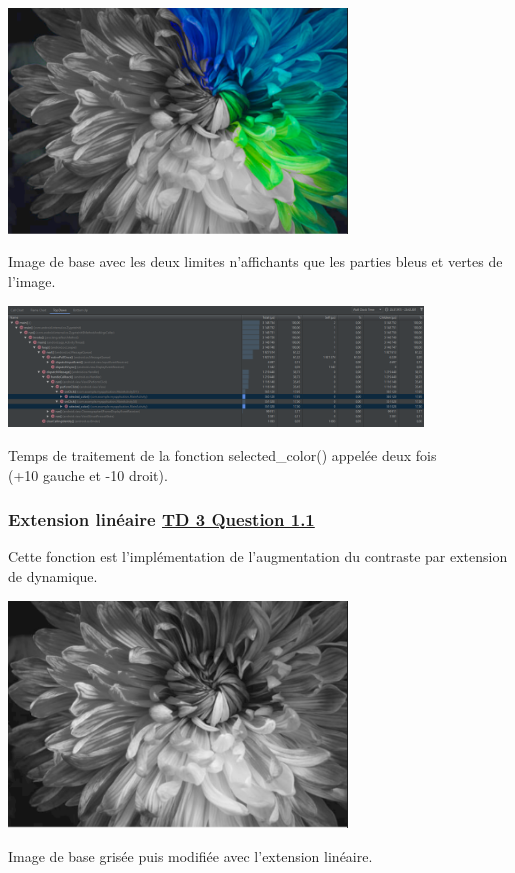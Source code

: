 \documentclass{article}
\begin{document}
\begin{center} 
    \includegraphics[width=9cm]{../Image_fonctions/SelectedColor}

    Image de base avec les deux limites n'affichants que les parties bleus et vertes de l'image.
\end{center}
\bigbreak

\begin{center} 
    \includegraphics[width=11cm]{../Image_temps/TempsSelectedColor}

    Temps de traitement de la fonction selected\_color() appelée deux fois\\(+10 gauche et -10 droit).
\end{center}
\bigbreak

\subsubsection{Extension linéaire \underline{TD 3 Question 1.1}}
Cette fonction est l'implémentation de l'augmentation du contraste par extension de dynamique.
\bigbreak

\begin{center} 
    \includegraphics[width=9cm]{../Image_fonctions/ExtensionLineaire}

    Image de base grisée puis modifiée avec l'extension linéaire.
\end{center}
\bigbreak
\end{document}
